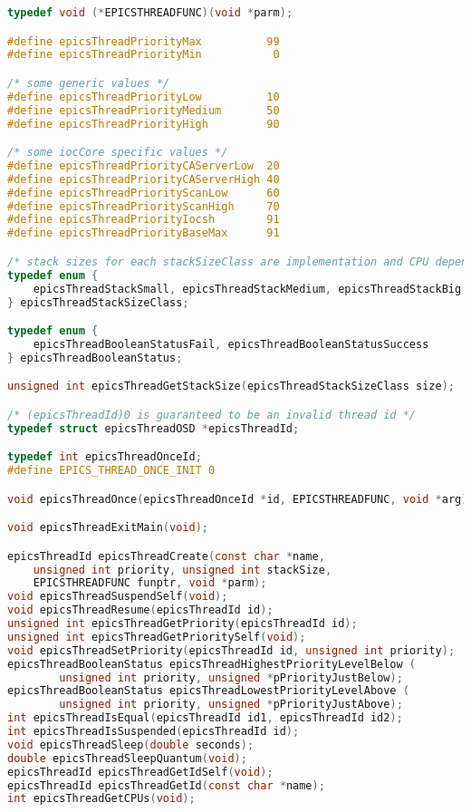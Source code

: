 \begin{lstlisting}[language=C]
typedef void (*EPICSTHREADFUNC)(void *parm);

#define epicsThreadPriorityMax          99
#define epicsThreadPriorityMin           0

/* some generic values */
#define epicsThreadPriorityLow          10
#define epicsThreadPriorityMedium       50
#define epicsThreadPriorityHigh         90

/* some iocCore specific values */
#define epicsThreadPriorityCAServerLow  20
#define epicsThreadPriorityCAServerHigh 40
#define epicsThreadPriorityScanLow      60
#define epicsThreadPriorityScanHigh     70
#define epicsThreadPriorityIocsh        91
#define epicsThreadPriorityBaseMax      91

/* stack sizes for each stackSizeClass are implementation and CPU dependent */
typedef enum {
    epicsThreadStackSmall, epicsThreadStackMedium, epicsThreadStackBig
} epicsThreadStackSizeClass;

typedef enum {
    epicsThreadBooleanStatusFail, epicsThreadBooleanStatusSuccess
} epicsThreadBooleanStatus;

unsigned int epicsThreadGetStackSize(epicsThreadStackSizeClass size);

/* (epicsThreadId)0 is guaranteed to be an invalid thread id */
typedef struct epicsThreadOSD *epicsThreadId;

typedef int epicsThreadOnceId;
#define EPICS_THREAD_ONCE_INIT 0

void epicsThreadOnce(epicsThreadOnceId *id, EPICSTHREADFUNC, void *arg);

void epicsThreadExitMain(void);

epicsThreadId epicsThreadCreate(const char *name,
    unsigned int priority, unsigned int stackSize,
    EPICSTHREADFUNC funptr, void *parm);
void epicsThreadSuspendSelf(void);
void epicsThreadResume(epicsThreadId id);
unsigned int epicsThreadGetPriority(epicsThreadId id);
unsigned int epicsThreadGetPrioritySelf(void);
void epicsThreadSetPriority(epicsThreadId id, unsigned int priority);
epicsThreadBooleanStatus epicsThreadHighestPriorityLevelBelow (
        unsigned int priority, unsigned *pPriorityJustBelow);
epicsThreadBooleanStatus epicsThreadLowestPriorityLevelAbove (
        unsigned int priority, unsigned *pPriorityJustAbove);
int epicsThreadIsEqual(epicsThreadId id1, epicsThreadId id2);
int epicsThreadIsSuspended(epicsThreadId id);
void epicsThreadSleep(double seconds);
double epicsThreadSleepQuantum(void);
epicsThreadId epicsThreadGetIdSelf(void);
epicsThreadId epicsThreadGetId(const char *name);
int epicsThreadGetCPUs(void);


\end{lstlisting}
